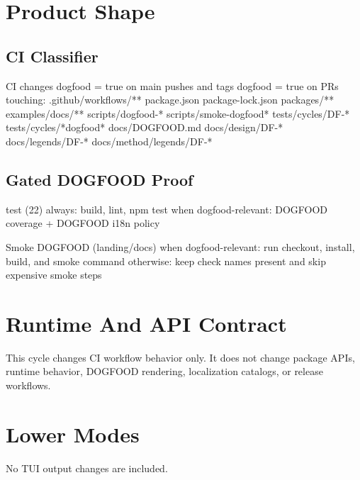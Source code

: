 \section{Product Shape}\label{record-211-product-shape}

\subsection{CI Classifier}\label{record-211-ci-classifier}

\begin{CodeBlock}
CI
  changes
    dogfood = true on main pushes and tags
    dogfood = true on PRs touching:
      .github/workflows/**
      package.json
      package-lock.json
      packages/**
      examples/docs/**
      scripts/dogfood-*
      scripts/smoke-dogfood*
      tests/cycles/DF-*
      tests/cycles/*dogfood*
      docs/DOGFOOD.md
      docs/design/DF-*
      docs/legends/DF-*
      docs/method/legends/DF-*
\end{CodeBlock}

\subsection{Gated DOGFOOD Proof}\label{record-211-gated-dogfood-proof}

\begin{CodeBlock}
test (22)
  always: build, lint, npm test
  when dogfood-relevant: DOGFOOD coverage + DOGFOOD i18n policy

Smoke DOGFOOD (landing/docs)
  when dogfood-relevant: run checkout, install, build, and smoke command
  otherwise: keep check names present and skip expensive smoke steps
\end{CodeBlock}

\section{Runtime And API Contract}\label{record-211-runtime-and-api-contract}

This cycle changes CI workflow behavior only. It does not change package APIs, runtime behavior, DOGFOOD rendering, localization catalogs, or release workflows.

\section{Lower Modes}\label{record-211-lower-modes}

No TUI output changes are included.

